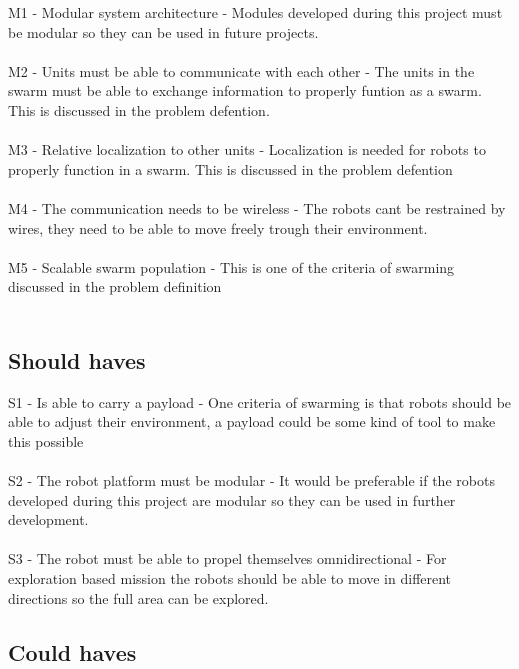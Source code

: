 \documentclass[10pt,a4paper]{article}
\begin{document}
M1 - Modular system architecture - Modules developed during this project must be modular so they can be used in future projects.\\\\
M2 - Units must be able to communicate with each other - The units in the swarm must be able to exchange information to properly funtion as a swarm. This is discussed in the problem defention\cite{multidomaincom}.  \\\\
M3 - Relative localization to other units - Localization is needed for robots to properly function in a swarm. This is discussed in the problem defention\cite{multidomaincom}\\\\
M4 - The communication needs to be wireless - The robots cant be restrained by wires, they need to be able to move freely trough their environment.\\\\
M5 - Scalable swarm population - This is one of the criteria of swarming discussed in the problem definition\\\\


\subsection{Should haves}

S1 - Is able to carry a payload - One criteria of swarming is that robots should be able to adjust their environment, a payload could be some kind of tool to make this possible\\\\
S2 - The robot platform must be modular - It would be preferable if the robots developed during this project are modular so they can be used in further development.\\\\
S3 - The robot must be able to propel themselves omnidirectional - For exploration based mission the robots should be able to move in different directions so the full area can be explored.\\

\subsection{Could haves}
\end{document}
